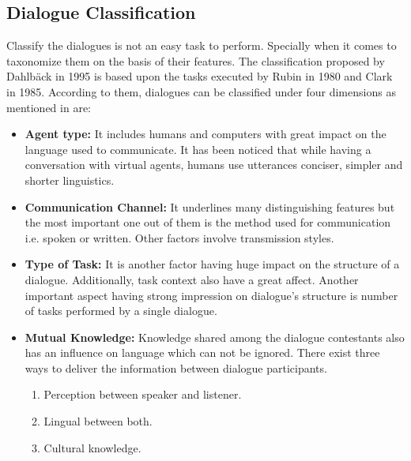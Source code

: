 \subsection{Dialogue Classification}
Classify the dialogues is not an easy task to perform. Specially when it comes to taxonomize them on the basis of their features. The classification proposed by Dahlbäck in 1995 is based upon the tasks executed by Rubin in 1980 and Clark in 1985. According to them, dialogues can be classified under four dimensions as mentioned in \cite{dialoguemanagementsystems} are:  
\begin{itemize}
\item \textbf{Agent type:} It includes humans and computers with great impact on the language used to communicate. It has been noticed that while having a conversation with virtual agents, humans use utterances conciser, simpler and shorter linguistics.
\item \textbf{Communication Channel:} It underlines many distinguishing  features but the most important one out of them is the method used for communication i.e. spoken or written. Other factors involve transmission styles. 
\item \textbf{Type of Task:} It is another factor having huge impact on the structure of a dialogue. Additionally, task context also have a great affect. Another important aspect having strong impression on dialogue's structure is number of tasks performed by a single dialogue.      
\item \textbf{Mutual Knowledge:} Knowledge shared among the dialogue contestants also has an influence on language which can not be ignored. There exist three ways to deliver the information between dialogue participants.
\begin{enumerate}
    \item Perception between speaker and listener.
    \item Lingual between both.
    \item Cultural knowledge.
\end{enumerate} 
\end{itemize}

